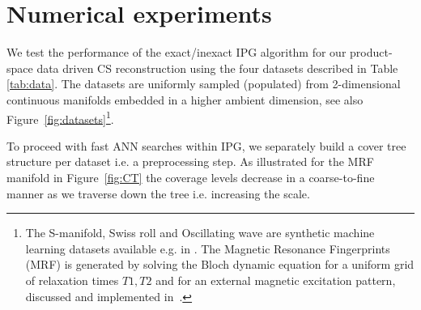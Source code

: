 \section{Numerical experiments}
\label{sec:expe}

We test the performance of the exact/inexact IPG algorithm for our product-space data driven CS reconstruction using the four datasets described in Table \ref{tab:data}. The datasets are uniformly sampled (populated) from 2-dimensional continuous manifolds embedded in a higher ambient dimension, see also  Figure~\ref{fig:datasets}\footnote{The S-manifold, Swiss roll and Oscillating wave are synthetic machine learning  datasets available e.g. in \cite{GMRA12}. The Magnetic Resonance Fingerprints (MRF) is generated by solving the Bloch dynamic equation for a uniform grid of relaxation times $T1,T2$ and for an external magnetic excitation pattern, discussed and implemented in~\cite{MRF}.}. 

To proceed with fast ANN searches within IPG, we separately build a cover tree structure per dataset i.e. a preprocessing step. As illustrated for the MRF manifold in Figure~\ref{fig:CT} the coverage levels 
decrease in a coarse-to-fine manner as we traverse down the tree i.e. increasing the scale.

